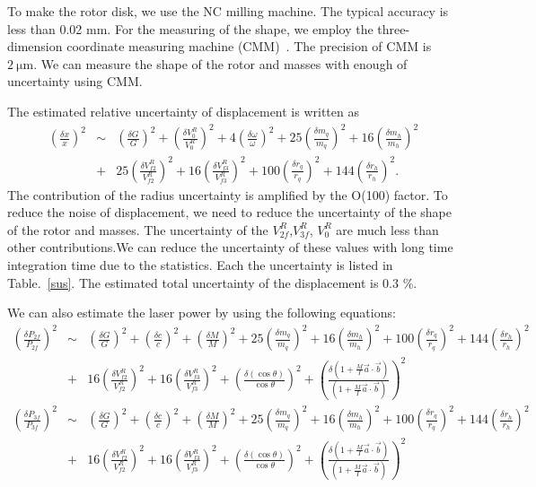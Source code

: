 \documentclass[A4]{spie}  %
\begin{document}
 To make the rotor disk, we use the NC milling machine. The typical accuracy is less than 0.02 mm. For the measuring of the shape, we employ the three-dimension coordinate measuring machine (CMM)~\cite{Inoue:2016kyq}. The precision of CMM is $2~\mathrm{\mu m}$. We can measure the shape of the rotor and masses with enough of uncertainty using CMM. 

 The estimated relative uncertainty of  displacement is written as
\begin{eqnarray}
\left( \frac{\delta x}{x} \right)^2 &\sim& \left( \frac{\delta G}{G} \right)^2 +\left( \frac{\delta V^R_0}{V^R_0} \right)^2+4\left( \frac{\delta \omega}{\omega} \right)^2+ 25\left( \frac{\delta m_q}{m_q} \right)^2 +16\left( \frac{\delta m_h}{m_h} \right)^2 \nonumber \\
&+&25\left( \frac{\delta V^R_{f2}}{V^R_{f2}} \right)^2+16\left( \frac{\delta V^R_{f3}}{V^R_{f3}} \right)^2+ 100\left( \frac{\delta r_q}{r_q} \right)^2 +144\left( \frac{\delta r_h}{r_h} \right)^2.
\end{eqnarray}
The contribution of the radius uncertainty is amplified by the O(100) factor. To reduce the noise of displacement, we need to reduce the uncertainty of the shape of the rotor and masses.
The uncertainty of the $V^R_{2f}$,$V^R_{3f}$, $V^R_{0}$ are much less than other contributions.We can reduce the uncertainty of these values with long time integration time due to the statistics. Each the uncertainty is listed in Table.~\ref{sus}. The estimated  total uncertainty of the displacement is 0.3 \%.

We can also estimate the laser power by using the following equations:
\begin{eqnarray}
\left( \frac{\delta P_{2f}}{P_{2f}} \right)^2 &\sim& \left( \frac{\delta G}{G} \right)^2 +\left( \frac{\delta c}{c} \right)^2+ \left( \frac{\delta M}{M} \right)^2+25\left( \frac{\delta m_q}{m_q} \right)^2+16\left( \frac{\delta m_h}{m_h} \right)^2 +100\left( \frac{\delta r_q}{r_q} \right)^2+144\left( \frac{\delta r_h}{r_h} \right)^2 \nonumber \\
&+&16\left( \frac{\delta V^R_{f2}}{V^R_{f2}} \right)^2+16\left( \frac{\delta V^R_{f3}}{V^R_{f3}} \right)^2+\left( \frac{\delta (\cos{\theta})}{\cos{\theta}} \right)^2+ \left( \frac{\delta\left( 1+\frac{M}{I}\vec{a}\cdot \vec{b} \right)}{\left( 1+\frac{M}{I}\vec{a}\cdot \vec{b} \right)} \right)^2 \\
\left( \frac{\delta P_{3f}}{P_{3f}} \right)^2 &\sim& \left( \frac{\delta G}{G} \right)^2 +\left( \frac{\delta c}{c} \right)^2+ \left( \frac{\delta M}{M} \right)^2+25\left( \frac{\delta m_q}{m_q} \right)^2+16\left( \frac{\delta m_h}{m_h} \right)^2 +100\left( \frac{\delta r_q}{r_q} \right)^2+144\left( \frac{\delta r_h}{r_h} \right)^2 \nonumber \\
&+&16\left( \frac{\delta V^R_{f2}}{V^R_{f2}} \right)^2+16\left( \frac{\delta V^R_{f3}}{V^R_{f3}} \right)^2+\left( \frac{\delta (\cos{\theta})}{\cos{\theta}} \right)^2+ \left( \frac{\delta\left( 1+\frac{M}{I}\vec{a}\cdot \vec{b} \right)}{\left( 1+\frac{M}{I}\vec{a}\cdot \vec{b} \right)} \right)^2 
\end{eqnarray}
\end{document}
